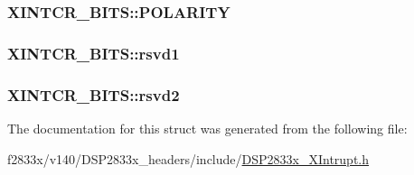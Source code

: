 \subsubsection[{P\+O\+L\+A\+R\+I\+T\+Y}]{ X\+I\+N\+T\+C\+R\+\_\+\+B\+I\+T\+S\+::\+P\+O\+L\+A\+R\+I\+T\+Y}\label{struct_x_i_n_t_c_r___b_i_t_s_a0b683dacb511ed51c22ddaafa0dd12ee}
\hypertarget{struct_x_i_n_t_c_r___b_i_t_s_a85870488d60516a6bd242b5e80971a6d}{}
\subsubsection[{rsvd1}]{ X\+I\+N\+T\+C\+R\+\_\+\+B\+I\+T\+S\+::rsvd1}\label{struct_x_i_n_t_c_r___b_i_t_s_a85870488d60516a6bd242b5e80971a6d}
\hypertarget{struct_x_i_n_t_c_r___b_i_t_s_a0373fa06b091a2850a355563eb567f93}{}
\subsubsection[{rsvd2}]{ X\+I\+N\+T\+C\+R\+\_\+\+B\+I\+T\+S\+::rsvd2}\label{struct_x_i_n_t_c_r___b_i_t_s_a0373fa06b091a2850a355563eb567f93}


The documentation for this struct was generated from the following file\+:\begin{DoxyCompactItemize}
\item 
f2833x/v140/\+D\+S\+P2833x\+\_\+headers/include/\hyperlink{_d_s_p2833x___x_intrupt_8h}{D\+S\+P2833x\+\_\+\+X\+Intrupt.\+h}\end{DoxyCompactItemize}
